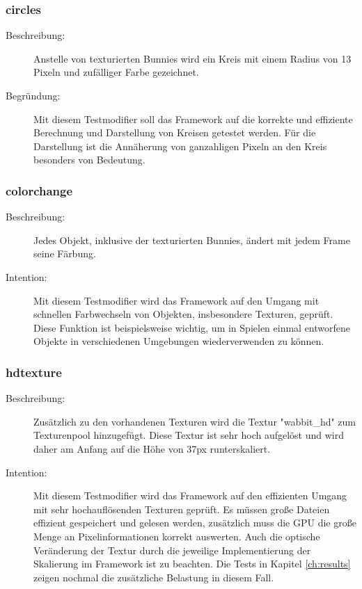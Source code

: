 \subsubsection{circles}
\begin{description}
\item[Beschreibung:] Anstelle von texturierten Bunnies wird ein Kreis mit einem Radius von 13 Pixeln und zufälliger Farbe gezeichnet. \\
\item[Begründung:] Mit diesem Testmodifier soll das Framework auf die korrekte und effiziente Berechnung und Darstellung von Kreisen getestet werden. Für die Darstellung ist die Annäherung von ganzahligen Pixeln an den Kreis besonders von Bedeutung.
\end{description} 

\subsubsection{colorchange}
\begin{description}
\item[Beschreibung:] Jedes Objekt, inklusive der texturierten Bunnies, ändert mit jedem Frame seine Färbung. \\
\item[Intention:] Mit diesem Testmodifier wird das Framework auf den Umgang mit schnellen Farbwechseln von Objekten, insbesondere Texturen, geprüft. Diese Funktion ist beispielsweise wichtig, um in Spielen einmal entworfene Objekte in verschiedenen Umgebungen wiederverwenden zu können.
\end{description} 

\subsubsection{hdtexture}
\begin{description}
\item[Beschreibung:] Zusätzlich zu den vorhandenen Texturen wird die Textur "wabbit\_hd" zum Texturenpool hinzugefügt. Diese Textur ist sehr hoch aufgelöst und wird daher am Anfang auf die Höhe von 37px runterskaliert. \\
\item[Intention:] Mit diesem Testmodifier wird das Framework auf den effizienten Umgang mit sehr hochauflösenden Texturen geprüft. Es müssen große Dateien effizient gespeichert und gelesen werden, zusätzlich muss die GPU die große Menge an Pixelinformationen korrekt auswerten. Auch die optische Veränderung der Textur durch die jeweilige Implementierung der Skalierung im Framework ist zu beachten. Die Tests in Kapitel \ref{ch:results} zeigen nochmal die zusätzliche Belastung in diesem Fall.
\end{description} 
 
